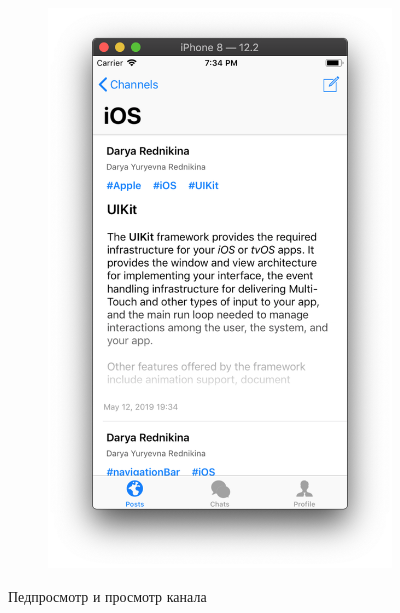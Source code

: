\documentclass[a4paper,12pt]{article}
\begin{document}
\begin{figure}[h!]
\begin{subfigure}[b]{0.3\linewidth}
		\includegraphics[width=\linewidth]{../includes/pmi/ios_channel.png}
	\end{subfigure}
	\caption{Педпросмотр и просмотр канала}
	\end{figure}
	
	\clearpage 
\end{document}

